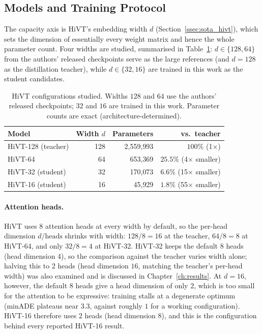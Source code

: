 \subsection{Models and Training Protocol}
\label{ssec:setup_models}
The capacity axis is HiVT's embedding width $d$ (Section~\ref{ssec:sota_hivt}),
which sets the dimension of essentially every weight matrix and hence the whole
parameter count. Four widths are studied, summarised in Table~\ref{tab:models}:
$d\in\{128,64\}$ from the authors' released checkpoints serve as the large
references (and $d{=}128$ as the distillation teacher), while $d\in\{32,16\}$ are
trained in this work as the student candidates.

\begin{table}[htbp]
  \centering
  \caption{HiVT configurations studied. Widths $128$ and $64$ use the authors'
    released checkpoints; $32$ and $16$ are trained in this work. Parameter counts
    are exact (architecture-determined).}
  \label{tab:models}
  \begin{tabular}{lrrr}
    \toprule
    Model       & Width $d$ & Parameters & vs.\ teacher \\
    \midrule
    HiVT-128 (teacher) & 128 & 2{,}559{,}993 & $100\%$ (1$\times$) \\
    HiVT-64            & 64  & 653{,}369     & $25.5\%$ (4$\times$ smaller) \\
    HiVT-32 (student)  & 32  & 170{,}073     & $6.6\%$ (15$\times$ smaller) \\
    HiVT-16 (student)  & 16  & 45{,}929      & $1.8\%$ (55$\times$ smaller) \\
    \bottomrule
  \end{tabular}
\end{table}

\paragraph{Attention heads.}
HiVT uses $8$ attention heads at every width by default, so the per-head
dimension $d/\text{heads}$ shrinks with width: $128/8{=}16$ at the teacher,
$64/8{=}8$ at HiVT-64, and only $32/8{=}4$ at HiVT-32. HiVT-32 keeps the default
$8$ heads (head dimension $4$), so the comparison against the teacher varies width
alone; halving this to $2$ heads (head dimension $16$, matching the teacher's
per-head width) was also examined and is discussed in
Chapter~\ref{ch:results}. At $d{=}16$, however, the default $8$ heads give a head
dimension of only $2$, which is too small for the attention to be expressive:
training stalls at a degenerate optimum (minADE plateaus near $3.3$, against
roughly $1$ for a working configuration). HiVT-16 therefore uses $2$ heads (head
dimension $8$), and this is the configuration behind every reported HiVT-16
result.

